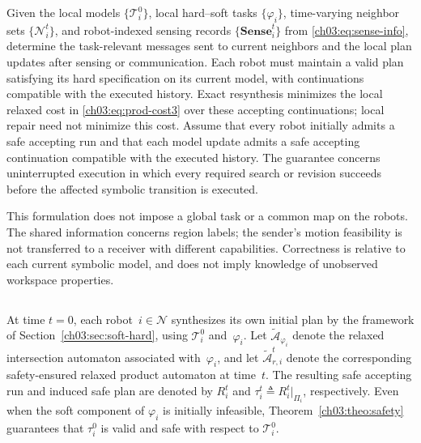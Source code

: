 \begin{revision}
\begin{problem}
Given the local models $\{\mathcal{T}_i^0\}$, local hard--soft tasks
$\{\varphi_i\}$, time-varying neighbor sets $\{\mathcal{N}_i^t\}$,
and robot-indexed sensing records $\{\textbf{Sense}_i^t\}$ from
\eqref{ch03:eq:sense-info}, determine the task-relevant messages sent to
current neighbors and the local plan updates after sensing or communication.
\label{ch03:prob:knowledge-transfer}
Each robot must maintain a valid plan satisfying its hard specification on
its current model, with continuations compatible with the executed history.
Exact resynthesis minimizes the local relaxed cost in
\eqref{ch03:eq:prod-cost3} over these accepting continuations; local repair
need not minimize this cost. Assume that every robot initially admits a
safe accepting run and that each model update admits a safe accepting
continuation compatible with the executed history. The guarantee concerns
uninterrupted execution in which every required search or revision succeeds
before the affected symbolic transition is executed.
\end{problem}

This formulation does not impose a global task or a common map on the
robots. The shared information concerns region labels; the sender's
motion feasibility is not transferred to a receiver with different
capabilities. Correctness is relative to each current symbolic model,
and does not imply knowledge of unobserved workspace properties.
\end{revision}

\subsection{}

At time $t = 0$, each robot~$i \in \mathcal{N}$ synthesizes its own initial
plan by the framework of Section~\ref{ch03:sec:soft-hard}, using
$\mathcal{T}_i^0$ and~$\varphi_i$. Let
$\tilde{\mathcal{A}}_{\varphi_i}$ denote the relaxed intersection automaton
associated with~$\varphi_i$, and let
$\tilde{\mathcal{A}}_{r,i}^t$ denote the corresponding safety-ensured relaxed
product automaton at time~$t$. The resulting safe accepting run and induced
safe plan are denoted by $R_i^t$ and $\tau_i^t \triangleq R_i^t|_{\Pi_i}$,
respectively. Even when the soft component of $\varphi_i$ is initially
infeasible, Theorem~\ref{ch03:theo:safety} guarantees that $\tau_i^0$ is valid
and safe with respect to $\mathcal{T}_i^0$.


